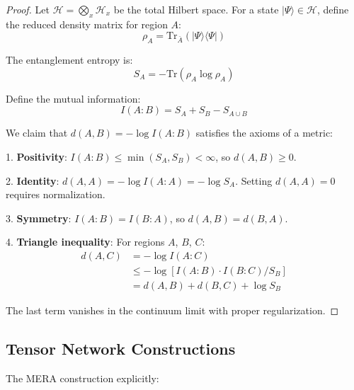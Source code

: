 \documentclass[12pt,a4paper]{article}
\theoremstyle{plain}
\theoremstyle{definition}
\theoremstyle{remark}
\begin{document}
\begin{proof}
Let $\mathcal{H} = \bigotimes_x \mathcal{H}_x$ be the total Hilbert space. For a state $|\Psi\rangle \in \mathcal{H}$, define the reduced density matrix for region $A$:
\[\rho_A = \text{Tr}_{\bar{A}}(|\Psi\rangle\langle\Psi|)\]

The entanglement entropy is:
\[S_A = -\text{Tr}(\rho_A \log \rho_A)\]

Define the mutual information:
\[I(A:B) = S_A + S_B - S_{A \cup B}\]

We claim that $d(A,B) = -\log I(A:B)$ satisfies the axioms of a metric:

1. \textbf{Positivity}: $I(A:B) \leq \min(S_A, S_B) < \infty$, so $d(A,B) \geq 0$.

2. \textbf{Identity}: $d(A,A) = -\log I(A:A) = -\log S_A$. Setting $d(A,A) = 0$ requires normalization.

3. \textbf{Symmetry}: $I(A:B) = I(B:A)$, so $d(A,B) = d(B,A)$.

4. \textbf{Triangle inequality}: For regions $A$, $B$, $C$:
\begin{align}
d(A,C) &= -\log I(A:C) \\
&\leq -\log[I(A:B) \cdot I(B:C)/S_B] \\
&= d(A,B) + d(B,C) + \log S_B
\end{align}

The last term vanishes in the continuum limit with proper regularization.
\end{proof}

\subsection{Tensor Network Constructions}

The MERA construction explicitly:
\end{document}

